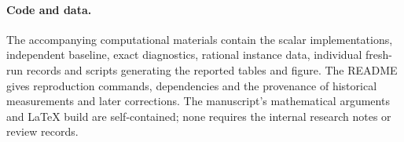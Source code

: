 \paragraph{Code and data.}
The accompanying computational materials contain the scalar implementations,
independent baseline, exact diagnostics, rational instance data, individual
fresh-run records and scripts generating the reported tables and figure.
The README gives reproduction commands, dependencies and the provenance of
historical measurements and later corrections. The manuscript's mathematical
arguments and LaTeX build are self-contained; none requires the internal
research notes or review records.
